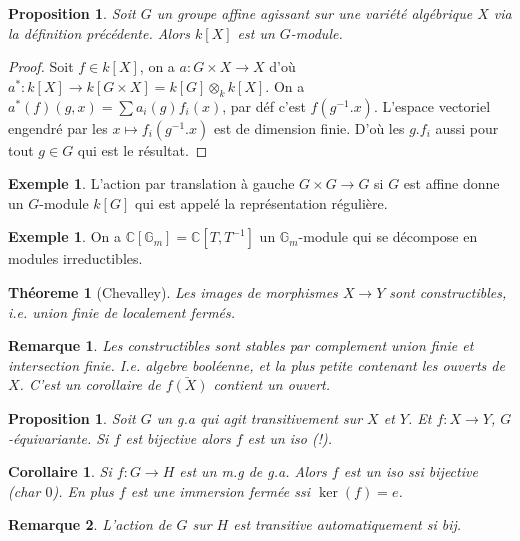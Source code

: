 \documentclass[a4paper,12pt]{book}
\newcommand{\C}{\mathbb{C}}
\newcommand{\Gr}{\mathbb{G}}
\theoremstyle{plain}
\newtheorem{thm}[subsection]{Théoreme}
\newtheorem{prop}[subsection]{Proposition}
\newtheorem{cor}[subsection]{Corollaire}
\newtheorem{rem}{Remarque}
\theoremstyle{definition}
\newtheorem{ex}[subsection]{Exemple}
\theoremstyle{remark}
\begin{document}
\begin{prop}
  Soit $G$ un groupe affine agissant sur une variété algébrique 
  $X$ via la définition précédente. Alors $k[X]$ est un $G$-module.
\end{prop}
\begin{proof}
  Soit $f\in k[X]$, on a $a\colon G\times X\to X$ d'où 
  $a^*\colon k[X]\to k[G\times X]=k[G]\otimes_k k[X]$. On a
  $a^*(f)(g,x)=\sum a_i(g)f_i(x)$, par déf c'est
  $f(g^{-1}.x)$. L'espace vectoriel engendré par les $x\mapsto
  f_i(g^{-1}.x)$ est de dimension finie. D'où les $g.f_i$ aussi
  pour tout $g\in G$ qui est le résultat.
\end{proof}
\begin{ex}
  L'action par translation à gauche $G\times G\to G$ si $G$
  est affine donne un $G$-module $k[G]$ qui est appelé la
  représentation régulière.
\end{ex}
\begin{ex}
  On a $\C[\Gr_m]=\C[T,T^{-1}]$ un $\Gr_m$-module qui se décompose
  en modules irreductibles.
\end{ex}

\begin{thm}[Chevalley]
  Les images de morphismes $X\to Y$ sont constructibles,
  i.e. union finie de localement fermés.
\end{thm}
\begin{rem}
  Les constructibles sont stables par complement union finie
  et intersection finie. I.e. algebre booléenne, et la plus 
  petite contenant les ouverts de $X$.
  C'est un corollaire de $\bar{f(X)}$ contient un ouvert.
\end{rem}

\begin{prop}
  Soit $G$ un g.a qui agit transitivement sur $X$ et $Y$.
  Et $f\colon X\to Y$, $G$-équivariante. Si $f$ est bijective
  alors $f$ est un iso (!).
\end{prop}
\begin{cor}
  Si $f\colon G\to H$ est un m.g de g.a. Alors $f$ est un iso
  ssi bijective (char $0$). En plus $f$ est une immersion fermée
  ssi $\ker(f)=e$.
\end{cor}
\begin{rem}
  L'action de $G$ sur $H$ est transitive automatiquement si bij.
\end{rem}


\printbibliography
\end{document}
